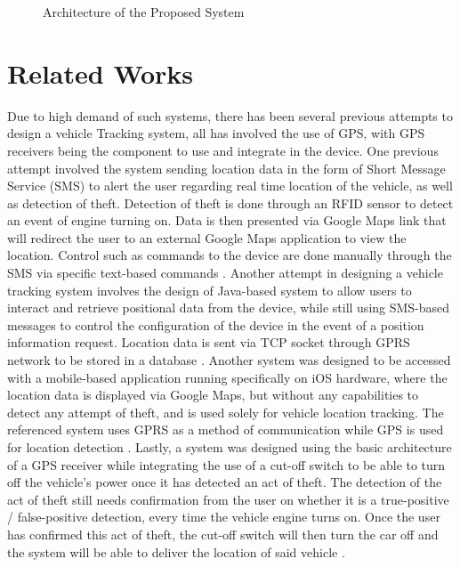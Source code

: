 \documentclass[conference]{IEEEtran}
\begin{document}
\begin{figure}[ht!]
    \centering
    \def\svgwidth{\columnwidth}
    \scalebox{1.8}{}
    \caption{Architecture of the Proposed System}
    \label{fig1}
\end{figure}

\section{Related Works}
Due to high demand of such systems, there has been several previous attempts to design a vehicle Tracking system, all has involved the use of GPS, with GPS receivers being the component to use and integrate in the device. One previous attempt involved the system sending location data in the form of Short Message Service (SMS) to alert the user regarding real time location of the vehicle, as well as detection of theft. Detection of theft is done through an RFID sensor to detect an event of engine turning on. Data is then presented via Google Maps link that will redirect the user to an external Google Maps application to view the location. Control such as commands to the device are done manually through the SMS via specific text-based commands \cite{iotmounika}. Another attempt in designing a vehicle tracking system involves the design of Java-based system to allow users to interact and retrieve positional data from the device, while still using SMS-based messages to control the 
configuration of the device in the event of a position information request. Location data is sent via TCP socket through GPRS network to be stored in a database \cite{6132526}. Another system was designed to be accessed with a mobile-based application running specifically on iOS hardware, where the location data is displayed via Google Maps, but without any capabilities to detect any attempt of theft, and is used solely for vehicle location tracking. The referenced system uses GPRS as a method of communication while GPS is used for location detection \cite{6803187}.
Lastly, a system was designed using the basic architecture of a GPS receiver while integrating the use of a cut-off switch to be able to turn off the vehicle's power once it has detected an act of theft. The detection of the act of theft still needs confirmation from the user on whether it is a true-positive / false-positive detection, every time the vehicle engine turns on. Once the user has confirmed this act of theft, the cut-off switch will then turn the car off and the system will be able to deliver the location of said vehicle \cite{article1}. 
\end{document}
